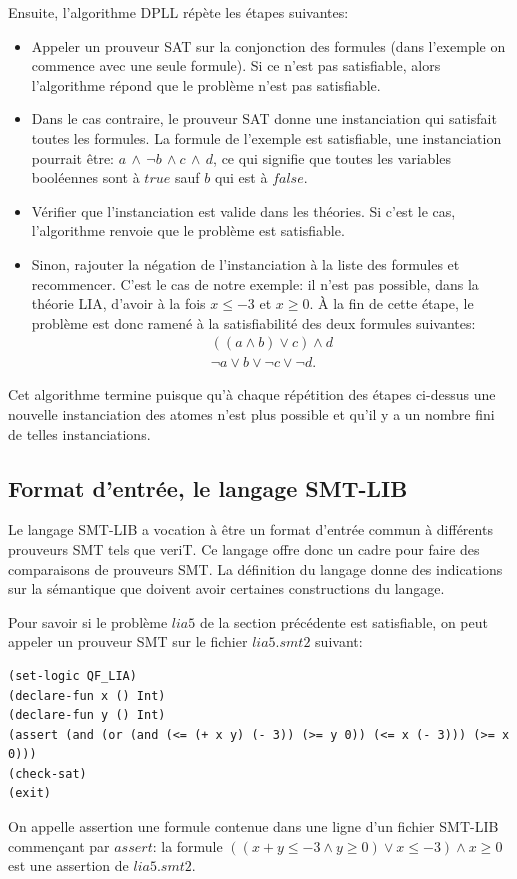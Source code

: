 \documentclass[11pt]{article}
\begin{document}
Ensuite, l'algorithme DPLL répète les étapes suivantes:
\begin{itemize}
\item Appeler un prouveur SAT sur la conjonction des formules (dans l'exemple on commence avec une seule formule). Si ce n'est pas satisfiable, alors l'algorithme répond que le problème n'est pas satisfiable.
\item Dans le cas contraire, le prouveur SAT donne une instanciation qui satisfait toutes les formules. La formule de l'exemple est satisfiable, une instanciation pourrait être:
  $a \, \wedge\,\neg b \, \wedge c\, \wedge \,d$,
ce qui signifie que toutes les variables booléennes sont à $true$ sauf $b$ qui est à $false$.
\item Vérifier que l'instanciation est valide dans les théories. Si c'est le cas, l'algorithme renvoie que le problème est satisfiable.
\item Sinon, rajouter la négation de l'instanciation à la liste des formules et recommencer. C'est le cas de notre exemple: il n'est pas possible, dans la théorie LIA, d'avoir à la fois $x \leq -3$ et $x \geq 0$. À la fin de cette étape, le problème est donc ramené à la satisfiabilité des deux formules suivantes:
  \begin{align*}
    ((a \wedge b) \vee c) \wedge d \\
    \neg a \vee b \vee \neg c \vee \neg d.
  \end{align*}
\end{itemize}

Cet algorithme termine puisque qu'à chaque répétition des étapes ci-dessus une nouvelle instanciation des atomes n'est plus possible et qu'il y a un nombre fini de telles instanciations. 

\subsection{Format d'entrée, le langage SMT-LIB} \label{smt-lib}

Le langage SMT-LIB a vocation à être un format d'entrée commun à différents prouveurs SMT tels que veriT. Ce langage offre donc un cadre pour faire des comparaisons de prouveurs SMT. La définition du langage \cite{smtlib} donne des indications sur la sémantique que doivent avoir certaines constructions du langage.\medbreak

Pour savoir si le problème $lia5$ de la section précédente est satisfiable, on peut appeler un prouveur SMT sur le fichier $lia5.smt2$ suivant:
\begin{lstlisting}[frame=single]
(set-logic QF_LIA)
(declare-fun x () Int)
(declare-fun y () Int)
(assert (and (or (and (<= (+ x y) (- 3)) (>= y 0)) (<= x (- 3))) (>= x 0)))
(check-sat)
(exit)
\end{lstlisting}
On appelle assertion une formule contenue dans une ligne d'un fichier SMT-LIB commençant par $assert$: la formule $((x + y \leq -3 \wedge y \geq 0) \vee x \leq -3) \wedge x \geq 0$ est une assertion de $lia5.smt2$.
\end{document}
